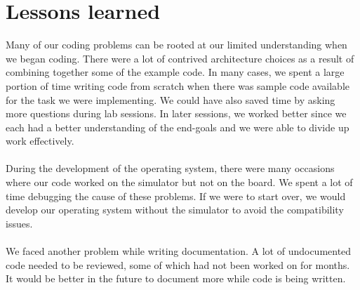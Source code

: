 \documentclass[12pt]{article}
\begin{document}
\section{Lessons learned}
Many of our coding problems can be rooted at our limited understanding when we began coding. There were a lot of contrived architecture choices as a result of combining together some of the example code. In many cases, we spent a large portion of time writing code from scratch when there was sample code available for the task we were implementing. We could have also saved time by asking more questions during lab sessions. In later sessions, we worked better since we each had a better understanding of the end-goals and we were able to divide up work effectively.\\ \\
During the development of the operating system, there were many occasions where our code worked on the simulator but not on the board. We spent a lot of time debugging the cause of these problems. If we were to start over, we would develop our operating system without the simulator to avoid the compatibility issues.\\ \\
We faced another problem while writing documentation. A lot of undocumented code needed to be reviewed, some of which had not been worked on for months. It would be better in the future to document more while code is being written.
\end{document}
